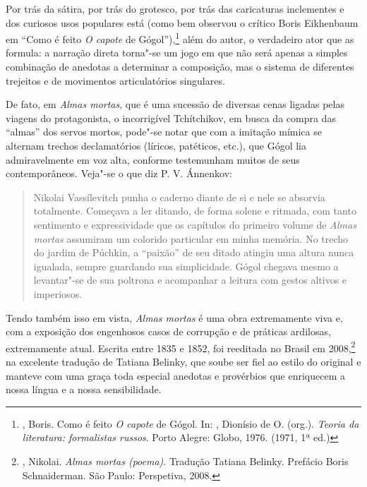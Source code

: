 Por trás da sátira, por trás do grotesco, por trás das caricaturas
inclementes e dos curiosos usos populares está (como bem observou o crítico Boris Eikhenbaum em ``Como é feito \emph{O capote} de Gógol''),\footnote{, Boris. Como é feito \emph{O capote} de Gógol. In: , Dionísio de O. (org.). \emph{Teoria da literatura: formalistas russos}. Porto Alegre: Globo, 1976. (1971, 1ª ed.)} além do autor, o verdadeiro ator que as formula: a narração direta torna"-se um jogo em que não será apenas a simples combinação de anedotas a determinar a composição, mas o sistema de diferentes trejeitos e de movimentos articulatórios singulares. 

De fato, em \emph{Almas mortas}, que é uma sucessão de diversas cenas ligadas pelas viagens do protagonista, o incorrigível Tchítchikov, em busca da compra das ``almas'' dos servos mortos, pode"-se notar que com a imitação mímica se alternam trechos declamatórios (líricos, patéticos, etc.), que Gógol lia admiravelmente em voz alta, conforme testemunham muitos de seus contemporâneos. Veja"-se o que diz P. V. Ánnenkov: 

\begin{quotation}
Nikolai Vassílevitch punha o caderno diante de si e nele se absorvia totalmente. Começava a ler ditando, de forma solene e ritmada, com tanto sentimento e expressividade que os capítulos do primeiro volume de \emph{Almas mortas} assumiram um colorido particular em minha memória. No trecho do jardim de Púchkin, a ``paixão'' de seu ditado atingiu uma altura nunca igualada, sempre guardando sua simplicidade. Gógol chegava mesmo a levantar"-se de sua poltrona e acompanhar a leitura com gestos altivos e imperiosos. 
\end{quotation}

Tendo também isso em vista, \emph{Almas mortas} é uma
obra extremamente viva e, com a exposição dos engenhosos casos de
corrupção e de práticas ardilosas, extremamente atual. Escrita entre
1835 e 1852, foi reeditada no Brasil em 2008,\footnote{, Nikolai. \emph{Almas mortas (poema)}. Tradução Tatiana Belinky. Prefácio Boris Schnaiderman. São Paulo: Perspetiva, 2008.} na excelente tradução de Tatiana Belinky, que soube ser fiel ao estilo do original e manteve com uma graça toda especial anedotas e provérbios que enriquecem a nossa língua e a nossa sensibilidade. 

